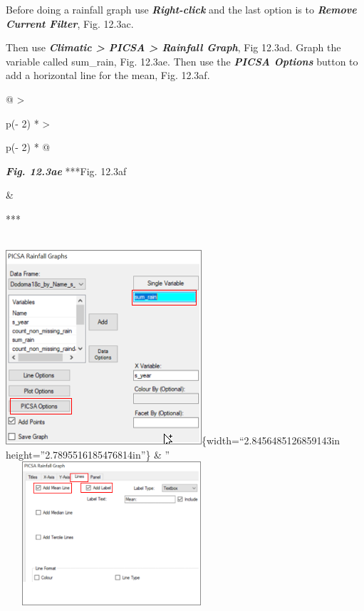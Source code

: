 \documentclass[
  letterpaper,
  DIV=11,
  numbers=noendperiod]{scrreprt}
\begin{document}
Before doing a rainfall graph use \textbf{\emph{Right-click}} and the
last option is to \textbf{\emph{Remove Current Filter}}, Fig. 12.3ac.

Then use \textbf{\emph{Climatic \textgreater{} PICSA \textgreater{}
Rainfall Graph}}, Fig 12.3ad. Graph the variable called sum\_rain, Fig.
12.3ae. Then use the \textbf{\emph{PICSA Options}} button to add a
horizontal line for the mean, Fig. 12.3af.

\begin{longtable}[]{@{}
  >{\raggedright\arraybackslash}p{(\columnwidth - 2\tabcolsep) * }
  >{\raggedright\arraybackslash}p{(\columnwidth - 2\tabcolsep) * }@{}}
\toprule\noalign{}
\begin{minipage}[b]{\linewidth}\raggedright
\textbf{\emph{Fig. 12.3ae}} ***Fig. 12.3af
\end{minipage} & \begin{minipage}[b]{\linewidth}\raggedright
***
\end{minipage} \\
\midrule\noalign{}
\endhead
\bottomrule\noalign{}
\endlastfoot
\includegraphics{figures/Fig12.3ae.png}\{width=``2.8456485126859143in
height=''2.7895516185476814in''\} & ''
\includegraphics[width=3.09351in,height=2.10585in]{figures/Fig12.3af.png} \\
\end{longtable}
\end{document}
